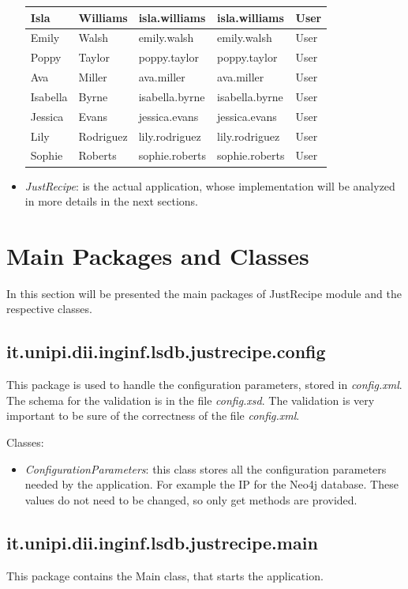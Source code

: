 \documentclass[a4paper]{report}
\begin{document}
\begin{itemize}
\begin{table}[htpb]
\begin{tabular}{|l|l|l|l|l|}
Isla & Williams & isla.williams & isla.williams & User \\ \hline
Emily & Walsh & emily.walsh & emily.walsh & User \\ \hline
Poppy & Taylor & poppy.taylor & poppy.taylor & User \\ \hline
Ava & Miller & ava.miller & ava.miller & User \\ \hline
Isabella & Byrne & isabella.byrne & isabella.byrne & User \\ \hline
Jessica & Evans & jessica.evans & jessica.evans & User \\ \hline
Lily & Rodriguez & lily.rodriguez & lily.rodriguez & User \\ \hline
Sophie & Roberts & sophie.roberts & sophie.roberts & User \\ \hline
\end{tabular}
\end{table}
	\item \emph{JustRecipe}:  is the actual application, whose implementation will be analyzed in more details in the next sections. 
\end{itemize}
\section{Main Packages and Classes}
In this section will be presented the main packages of JustRecipe module and the respective classes.
\subsection {it.unipi.dii.inginf.lsdb.justrecipe.config}
This package is used to handle the configuration parameters, stored in \emph{config.xml}. The schema for the validation is in the file \emph{config.xsd}. The validation is very important to be sure of the correctness of the file \emph{config.xml}.

\noindent Classes:
 \begin{itemize}
	\item \emph{ConfigurationParameters}: this class stores all the configuration parameters needed by the application. For example the IP for the Neo4j database. These values do not need to be changed, so only get methods are provided. 
\end{itemize}
\subsection {it.unipi.dii.inginf.lsdb.justrecipe.main}
This package contains the Main class, that starts the application.
\end{document}
